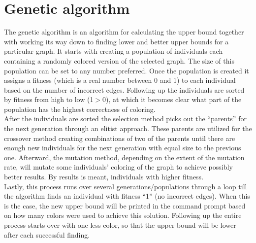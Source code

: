 \documentclass[a4paper]{report}
\begin{document}
		\section{Genetic algorithm}
		The genetic algorithm is an algorithm for calculating the upper bound together with working its way down to finding lower and better upper bounds for a particular graph. It starts with creating a population of individuals each containing a randomly colored version of the selected graph. The size of this population can be set to any number preferred. Once the population is created it assigns a fitness (which is a real number between 0 and 1) to each individual based on the number of incorrect edges. Following up the individuals are sorted by fitness from high to low (1$>$0), at which it becomes clear what part of the population has the highest correctness of coloring.\\
		
		After the individuals are sorted the selection method picks out the “parents” for the next generation through an elitist approach. These parents are utilized for the crossover method creating combinations of two of the parents until there are enough new individuals for the next generation with equal size to the previous one. Afterward, the mutation method, depending on the extent of the mutation rate, will mutate some individuals’ coloring of the graph to achieve possibly better results. By results is meant, individuals with higher fitness.
\\
		
		Lastly, this process runs over several generations/populations through a loop till the algorithm finds an individual with fitness “1” (no incorrect edges). When this is the case, the new upper bound will be printed in the command prompt based on how many colors were used to achieve this solution. Following up the entire process starts over with one less color, so that the upper bound will be lower after each successful finding.
		
\end{document}
